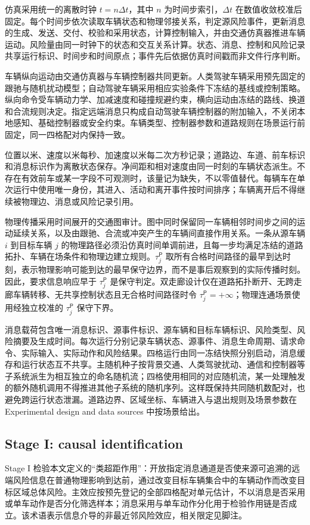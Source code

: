 \documentclass[10pt,a4paper,twocolumn]{article}
\begin{document}
仿真采用统一的离散时钟 $t=n\Delta t$，其中 $n$ 为时间步索引，$\Delta t$ 在数值收敛校准后固定。每个时间步依次读取车辆状态和物理邻接关系，判定源风险事件，更新消息的生成、发送、交付、校验和采用状态，计算控制输入，并由交通仿真器推进车辆运动。风险量由同一时钟下的状态和交互关系计算。状态、消息、控制和风险记录共享运行标识、时间步和时间原点；事件先后依据仿真时间戳而非文件行序判断。

车辆纵向运动由交通仿真器与车辆控制器共同更新。人类驾驶车辆采用预先固定的跟驰与随机扰动模型；自动驾驶车辆采用相应实验条件下冻结的基线或控制策略。纵向命令受车辆动力学、加减速度和碰撞规避约束，横向运动由冻结的路线、换道和合流规则决定。指定远端消息只构成自动驾驶车辆控制器的附加输入，不关闭本地感知、基础控制器或安全约束。车辆类型、控制器参数和道路规则在场景运行前固定，同一四格配对内保持一致。

位置以米、速度以米每秒、加速度以米每二次方秒记录；道路边、车道、前车标识和消息标识作为离散状态保存。净间距和相对速度由同一时刻的车辆状态派生。不存在有效前车或某一字段不可观测时，该量记为缺失，不以零值替代。每辆车在单次运行中使用唯一身份，其进入、活动和离开事件按时间排序；车辆离开后不得继续被物理边、消息或风险记录引用。

物理传播采用时间展开的交通图审计。图中同时保留同一车辆相邻时间步之间的运动延续关系，以及由跟驰、合流或冲突产生的车辆间直接作用关系。一条从源车辆 $i$ 到目标车辆 $j$ 的物理路径必须沿仿真时间单调前进，且每一步均满足冻结的道路拓扑、车辆在场条件和物理边建立规则。$\tau_j^{\mathsf P}$ 取所有合格时间路径的最早到达时刻，表示物理影响可能到达的最早保守边界，而不是事后观察到的实际传播时刻。因此，要求信息响应早于 $\tau_j^{\mathsf P}$ 是保守判定。双走廊设计仅在道路拓扑断开、无跨走廊车辆转移、无共享控制状态且无合格时间路径时令 $\tau_j^{\mathsf P}=+\infty$；物理连通场景使用经独立校准的 $\tau_j^{\mathsf P}$ 保守下界。

消息载荷包含唯一消息标识、源事件标识、源车辆和目标车辆标识、风险类型、风险摘要及生成时间。每次运行分别记录车辆状态、源事件、消息生命周期、请求命令、实际输入、实际动作和风险结果。四格运行由同一冻结快照分别启动，消息缓存和运行状态互不共享。主随机种子按背景交通、人类驾驶扰动、通信和控制器等子系统派生为相互独立的命名随机流；四格使用相同的对应随机流，某一处理触发的额外随机调用不得推进其他子系统的随机序列。这样既保持共同随机数配对，也避免跨运行状态泄漏。道路边界、区域坐标、车辆进入与退出规则及场景参数在 Experimental design and data sources 中按场景给出。

\subsection*{Stage I: causal identification}
Stage I 检验本文定义的“类超距作用”：开放指定消息通道是否使来源可追溯的远端风险信息在普通物理影响到达前，通过改变目标车辆集合中的车辆动作而改变目标区域总体风险。主效应按预先登记的全部四格配对单元估计，不以消息是否采用或单车动作是否分化筛选样本；消息采用与单车动作分化用于检验作用链是否成立。该术语表示信息介导的非最近邻风险效应，相关限定见脚注。
\end{document}
